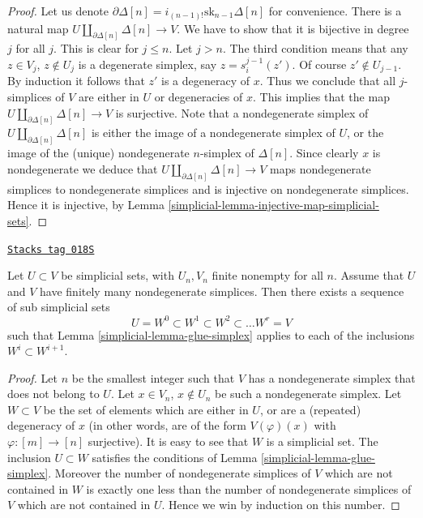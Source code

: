 \begin{proof}

Let us denote $\partial \Delta[n] = i_{(n - 1)!} \text{sk}_{n - 1} \Delta[n]$
for convenience. There is a natural map
$U \amalg_{\partial \Delta[n]} \Delta[n] \to V$.
We have to show that it is bijective in degree $j$
for all $j$. This is clear for $j \leq n$. Let $j > n$.
The third condition means that any $z \in V_j$, $z \not \in U_j$
is a degenerate simplex, say $z = s^{j - 1}_i(z')$. Of course
$z' \not \in U_{j - 1}$. By induction it follows that $z'$
is a degeneracy of $x$. Thus we conclude that all $j$-simplices
of $V$ are either in $U$ or degeneracies of $x$. This implies
that the map $U \amalg_{\partial \Delta[n]} \Delta[n] \to V$
is surjective. Note that a nondegenerate simplex of
$U \amalg_{\partial \Delta[n]} \Delta[n]$ is either
the image of a nondegenerate simplex of $U$, or
the image of the (unique) nondegenerate $n$-simplex
of $\Delta[n]$. Since clearly $x$ is nondegenerate we
deduce that $U \amalg_{\partial \Delta[n]} \Delta[n] \to V$
maps nondegenerate simplices to nondegenerate simplices
and is injective on nondegenerate simplices. Hence it is
injective, by Lemma \ref{simplicial-lemma-injective-map-simplicial-sets}.
\end{proof}

\begin{lemma}
\label{simplicial-lemma-add-simplices}
\href{https://stacks.math.columbia.edu/tag/018S}{\texttt{Stacks tag 018S}}

Let $U \subset V$ be simplicial sets, with $U_n, V_n$
finite nonempty for all $n$.
Assume that $U$ and $V$ have finitely many nondegenerate simplices.
Then there exists a sequence of sub simplicial sets
$$
U = W^0 \subset W^1 \subset W^2 \subset \ldots W^r = V
$$
such that Lemma \ref{simplicial-lemma-glue-simplex} applies to each of
the inclusions $W^i \subset W^{i + 1}$.
\end{lemma}

\begin{proof}

Let $n$ be the smallest integer such that $V$ has a nondegenerate
simplex that does not belong to $U$. Let $x \in V_n$, $x\not \in U_n$
be such a nondegenerate simplex. Let $W \subset V$ be the set
of elements which are either in $U$, or are a (repeated) degeneracy
of $x$ (in other words, are of the form $V(\varphi)(x)$
with $\varphi : [m] \to [n]$ surjective). It is easy to see
that $W$ is a simplicial set. The
inclusion $U \subset W$ satisfies the conditions of Lemma
\ref{simplicial-lemma-glue-simplex}. Moreover the number of nondegenerate
simplices of $V$ which are not contained in $W$ is exactly
one less than the number of nondegenerate
simplices of $V$ which are not contained in $U$.
Hence we win by induction on this number.
\end{proof}

